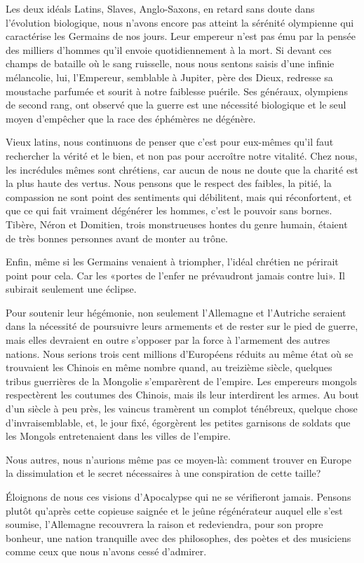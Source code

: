 \begin{chapter}{Les deux idéals}
Latins, Slaves, Anglo-Saxons, en retard sans doute dans l'évolution
biologique, nous n'avons encore pas atteint la sérénité olympienne qui
caractérise les Germains de nos jours. Leur empereur n'est pas ému par
la pensée des milliers d'hommes qu'il envoie quotidiennement à la mort.
Si devant ces champs de bataille où le sang ruisselle, nous nous sentons
saisis d'une infinie mélancolie, lui, l'Empereur, semblable à Jupiter,
père des Dieux, redresse sa moustache parfumée et sourit à notre
faiblesse puérile. Ses généraux, olympiens de second rang, ont observé
que la guerre est une nécessité biologique et le seul moyen d'empêcher
que la race des éphémères ne dégénère.

Vieux latins, nous continuons de penser que c'est pour eux-mêmes qu'il
faut rechercher la vérité et le bien, et non pas pour accroître notre
vitalité. Chez nous, les incrédules mêmes sont chrétiens, car aucun de
nous ne doute que la charité est la plus haute des vertus. Nous pensons
que le respect des faibles, la pitié, la compassion ne sont point des
sentiments qui débilitent, mais qui réconfortent, et que ce qui fait
vraiment dégénérer les hommes, c'est le pouvoir sans bornes. Tibère,
Néron et Domitien, trois monstrueuses hontes du genre humain, étaient de
très bonnes personnes avant de monter au trône.

Enfin, même si les Germains venaient à triompher, l'idéal chrétien ne
périrait point pour cela. Car les «portes de l'enfer ne prévaudront
jamais contre lui». Il subirait seulement une éclipse.

Pour soutenir leur hégémonie, non seulement l'Allemagne et l'Autriche
seraient dans la nécessité de poursuivre leurs armements et de rester
sur le pied de guerre, mais elles devraient en outre s'opposer par la
force à l'armement des autres nations. Nous serions trois cent millions
d'Européens réduits au même état où se trouvaient les Chinois en même
nombre quand, au treizième siècle, quelques tribus guerrières de la
Mongolie s'emparèrent de l'empire. Les empereurs mongols respectèrent
les coutumes des Chinois, mais ils leur interdirent les armes. Au bout
d'un siècle à peu près, les vaincus tramèrent un complot ténébreux,
quelque chose d'invraisemblable, et, le jour fixé, égorgèrent les
petites garnisons de soldats que les Mongols entretenaient dans les
villes de l'empire.

Nous autres, nous n'aurions même pas ce moyen-là: comment trouver en
Europe la dissimulation et le secret nécessaires à une conspiration de
cette taille?

Éloignons de nous ces visions d'Apocalypse qui ne se vérifieront
jamais. Pensons plutôt qu'après cette copieuse saignée et le jeûne
régénérateur auquel elle s'est soumise, l'Allemagne recouvrera la raison
et redeviendra, pour son propre bonheur, une nation tranquille avec des
philosophes, des poètes et des musiciens comme ceux que nous n'avons
cessé d'admirer.

\end{chapter}


